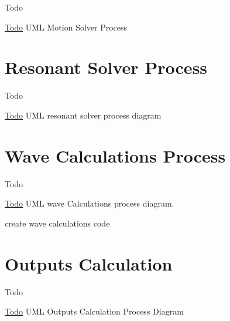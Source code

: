 \begin{DoxyRefDesc}{Todo}
\item[\hyperlink{todo__todo000004}{Todo}]U\-M\-L Motion Solver Process\end{DoxyRefDesc}
\hypertarget{UML_ResonantSolver}{}\section{Resonant Solver Process}\label{UML_ResonantSolver}
\begin{DoxyRefDesc}{Todo}
\item[\hyperlink{todo__todo000007}{Todo}]U\-M\-L resonant solver process diagram\end{DoxyRefDesc}
\hypertarget{UML_WaveCalculation}{}\section{Wave Calculations Process}\label{UML_WaveCalculation}
\begin{DoxyRefDesc}{Todo}
\item[\hyperlink{todo__todo000008}{Todo}]U\-M\-L wave Calculations process diagram. 

create wave calculations code\end{DoxyRefDesc}
\hypertarget{UML_OutputsCalculation}{}\section{Outputs Calculation}\label{UML_OutputsCalculation}
\begin{DoxyRefDesc}{Todo}
\item[\hyperlink{todo__todo000005}{Todo}]U\-M\-L Outputs Calculation Process Diagram\end{DoxyRefDesc}
